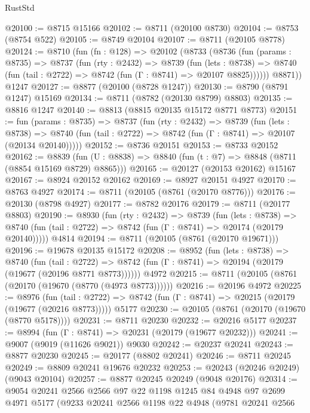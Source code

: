 \begin{lexlean}{RustStd}
\begin{coremodule}
@20100 := @8715 @15166
@20102 := @8711 (@20100 @8730)
@20104 := @8753 (@8754 @522)
@20105 := @8749 @20104
@20107 := @8711 (@20105 @8778)
@20124 := @8710
    (fun (fn : @128) =>
    @20102
      (@8733
        (@8736
          (fun (params : @8735) =>
          @8737
            (fun (rty : @2432) =>
            @8739
              (fun (lets : @8738) =>
              @8740 (fun (tail : @2722) => @8742 (fun (Γ : @8741) => @20107 @8825))))))
        @8871))
    @1247
@20127 := @8877 (@20100 (@8728 @1247))
@20130 := @8790 (@8791 @1247) @15169
@20134 := @8711 (@8782 (@20130 @8799) @8803)
@20135 := @8816 @1247
@20140 := @8813 (@8815 @20135 @15172 @8771 @8773)
@20151 := fun (params : @8735) =>
  @8737
    (fun (rty : @2432) =>
    @8739
      (fun (lets : @8738) =>
      @8740 (fun (tail : @2722) => @8742 (fun (Γ : @8741) => @20107 (@20134 @20140)))))
@20152 := @8736 @20151
@20153 := @8733 @20152
@20162 := @8839
    (fun (U : @8838) => @8840 (fun (t : @7) => @8848 (@8711 (@8854 @15169 @8729) @8865)))
@20165 := @20127 (@20153 @20162) @15167
@20167 := @8924 @20152 @20162
@20169 := @8927 @20151 @4927
@20170 := @8763 @4927
@20174 := @8711 (@20105 (@8761 (@20170 @8776)))
@20176 := @20130 (@8798 @4927)
@20177 := @8782 @20176
@20179 := @8711 (@20177 @8803)
@20190 := @8930
    (fun (rty : @2432) =>
    @8739
      (fun (lets : @8738) =>
      @8740 (fun (tail : @2722) => @8742 (fun (Γ : @8741) => @20174 (@20179 @20140)))))
    @4814
@20194 := @8711 (@20105 (@8761 (@20170 @19671)))
@20196 := @19678 @20135 @15172
@20208 := @8952
    (fun (lets : @8738) =>
    @8740
      (fun (tail : @2722) =>
      @8742 (fun (Γ : @8741) => @20194 (@20179 (@19677 (@20196 @8771 @8773))))))
    @4972
@20215 := @8711 (@20105 (@8761 (@20170 (@19670 (@8770 (@4973 @8773))))))
@20216 := @20196 @4972
@20225 := @8976
    (fun (tail : @2722) => @8742 (fun (Γ : @8741) => @20215 (@20179 (@19677 (@20216 @8773)))))
    @5177
@20230 := @20105 (@8761 (@20170 (@19670 (@8770 @5178))))
@20231 := @8711 @20230
@20232 := @20216 @5177
@20237 := @8994 (fun (Γ : @8741) => @20231 (@20179 (@19677 @20232)))
@20241 := @9007 (@9019 (@11626 @9021)) @9030
@20242 := @20237 @20241
@20243 := @8877 @20230
@20245 := @20177 (@8802 @20241)
@20246 := @8711 @20245
@20249 := @8809 @20241 @19676 @20232
@20253 := @20243 (@20246 @20249) (@9043 @20104)
@20257 := @8877 @20245 @20249 (@9048 @20176)
@20314 := @9054
    @20241
    @2566
    @2566
    @97
    @22
    @1198
    @1245
    @84
    @4948
    @97
    @2699
    @4971
    @5177
    (@9233
      @20241
      @2566
      @1198
      @22
      @4948
      (@9781
        @20241
        @2566

\end{coremodule}
\end{lexlean}
